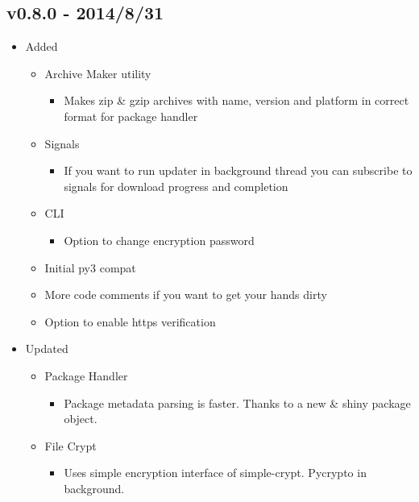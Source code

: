 \documentclass[letterpaper,10pt,english]{sphinxmanual}
\begin{document}
\subsection{v0.8.0 - 2014/8/31}
\label{release_history:v0-8-0-2014-8-31}\begin{itemize}
\item {} 
Added
\begin{itemize}
\item {} 
Archive Maker utility
\begin{itemize}
\item {} 
Makes zip \& gzip archives with name, version
and platform in correct format for package handler

\end{itemize}

\item {} 
Signals
\begin{itemize}
\item {} 
If you want to run updater in background
thread you can subscribe to signals for
download progress and completion

\end{itemize}

\item {} 
CLI
\begin{itemize}
\item {} 
Option to change encryption password

\end{itemize}

\item {} 
Initial py3 compat

\item {} 
More code comments if you want to get your
hands dirty

\item {} 
Option to enable https verification

\end{itemize}

\item {} 
Updated
\begin{itemize}
\item {} 
Package Handler
\begin{itemize}
\item {} 
Package metadata parsing is faster. Thanks
to a new \& shiny package object.

\end{itemize}

\item {} 
File Crypt
\begin{itemize}
\item {} 
Uses simple encryption interface of
simple-crypt. Pycrypto in background.


\end{itemize}
\end{itemize}
\end{itemize}
\end{document}
